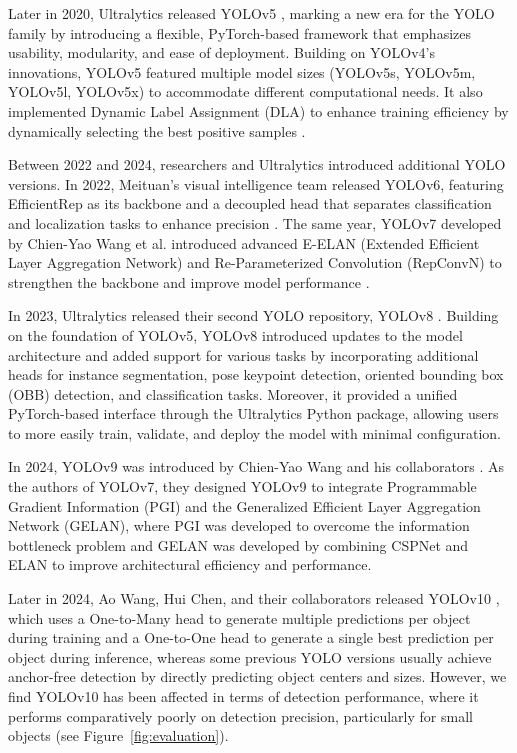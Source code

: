 Later in 2020, Ultralytics released YOLOv5 \cite{Jocher2020a}, marking a new era for the YOLO family by introducing a flexible, PyTorch-based framework that emphasizes usability, modularity, and ease of deployment. Building on YOLOv4’s innovations, YOLOv5 featured multiple model sizes (YOLOv5s, YOLOv5m, YOLOv5l, YOLOv5x) to accommodate different computational needs. It also implemented Dynamic Label Assignment (DLA) to enhance training efficiency by dynamically selecting the best positive samples \cite{Ge2021}.

Between 2022 and 2024, researchers and Ultralytics introduced additional YOLO versions. In 2022, Meituan’s visual intelligence team released YOLOv6, featuring EfficientRep as its backbone and a decoupled head that separates classification and localization tasks to enhance precision \cite{Li2022}. The same year, YOLOv7 developed by Chien-Yao Wang et al. introduced advanced E-ELAN (Extended Efficient Layer Aggregation Network) and Re-Parameterized Convolution (RepConvN) to strengthen the backbone and improve model performance \cite{Wang2023}.

In 2023, Ultralytics released their second YOLO repository, YOLOv8 \cite{Jocher2023}. Building on the foundation of YOLOv5, YOLOv8 introduced updates to the model architecture and added support for various tasks by incorporating additional heads for instance segmentation, pose keypoint detection, oriented bounding box (OBB) detection, and classification tasks. Moreover, it provided a unified PyTorch-based interface through the Ultralytics Python package, allowing users to more easily train, validate, and deploy the model with minimal configuration.

In 2024, YOLOv9 was introduced by Chien-Yao Wang and his collaborators \cite{Wang2025}. As the authors of YOLOv7, they designed YOLOv9 to integrate Programmable Gradient Information (PGI) and the Generalized Efficient Layer Aggregation Network (GELAN), where PGI was developed to overcome the information bottleneck problem and GELAN was developed by combining CSPNet and ELAN to improve architectural efficiency and performance.

Later in 2024, Ao Wang, Hui Chen, and their collaborators released YOLOv10 \cite{Wang2024a}, which uses a One-to-Many head to generate multiple predictions per object during training and a One-to-One head to generate a single best prediction per object during inference, whereas some previous YOLO versions usually achieve anchor-free detection by directly predicting object centers and sizes. However, we find YOLOv10 has been affected in terms of detection performance, where it performs comparatively poorly on detection precision, particularly for small objects (see Figure~\ref{fig:evaluation}).

